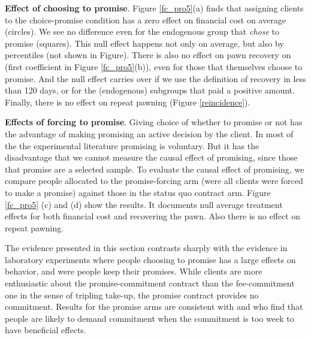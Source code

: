 \documentclass[oneside,11pt]{article}
\begin{document}
\vspace{.2in}
\noindent \textbf{Effect of choosing to promise}. Figure \ref{fc_pro5}(a) finds that assigning clients to the choice-promise condition has a zero effect on financial cost on average (circles). We see no difference even for the endogenous group that \textit{chose} to promise (squares). This null effect happens not only on average, but also by percentiles (not shown in Figure). There is also no effect on pawn recovery on (first coefficient in Figure \ref{fc_pro5}(b)), even for those that themselves choose to promise. And the null effect carries over if we use the definition of recovery in less than 120 days, or for the (endogenous) subgroups that paid a positive amount. Finally, there is no effect on repeat pawning (Figure \ref{reincidence}). 

\vspace{.2in}
\noindent \textbf{Effects of forcing to promise}. Giving choice of whether to promise or not has the advantage of making promising an active decision by the client. In most of the the experimental literature promising is voluntary. But it has the disadvantage that we cannot measure the causal effect of promising, since those that promise are a selected sample. To evaluate the causal effect of promising, we compare people allocated to the promise-forcing arm (were all clients were forced to make a promise) against those in the status quo contract arm. Figure \ref{fc_pro5} (c) and (d) show the results. It documents null average treatment effects for both financial cost and recovering the pawn. Also there is no effect on repeat pawning.

\vspace{.2in}
\noindent The evidence presented in this section contrasts sharply with the evidence in laboratory experiments where people choosing to promise has a large effects on behavior, and were people keep their promises. While clients are more enthusiastic about the promise-commitment contract than the fee-commitment one in the sense of tripling take-up, the promise contract provides no commitment. Results for the promise arms are consistent with \cite{Ted} and \cite{John} who find that people are likely to demand commitment when the commitment is too week to have beneficial effects.
   
   
\end{document}
